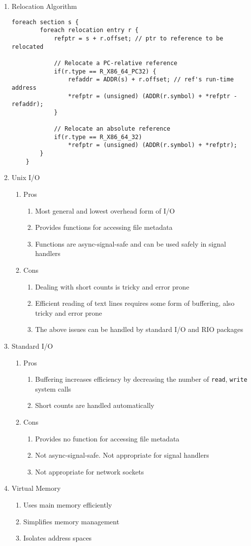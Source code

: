 \documentclass[12pt]{article}
\begin{document}
{\begin{enumerate}
\item Relocation Algorithm
\begin{lstlisting}[style=Cstyle]
	foreach section s {
		foreach relocation entry r {
			refptr = s + r.offset; // ptr to reference to be relocated
			
			// Relocate a PC-relative reference
			if(r.type == R_X86_64_PC32) {
				refaddr = ADDR(s) + r.offset; // ref's run-time address
				*refptr = (unsigned) (ADDR(r.symbol) + *refptr - refaddr);
			}
			
			// Relocate an absolute reference
			if(r.type == R_X86_64_32)
				*refptr = (unsigned) (ADDR(r.symbol) + *refptr);
		}
	}
\end{lstlisting}

\item Unix I/O
\begin{enumerate}
	\item Pros
	\begin{enumerate}
		\item Most general and lowest overhead form of I/O
		\item Provides functions for accessing file metadata
		\item Functions are async-signal-safe and can be used safely in signal handlers
	\end{enumerate}
	\item Cons
	\begin{enumerate}
		\item Dealing with short counts is tricky and error prone
		\item Efficient reading of text lines requires some form of buffering, also tricky and error prone
		\item The above issues can be handled by standard I/O and RIO packages
	\end{enumerate}
\end{enumerate}
\item Standard I/O
\begin{enumerate}
	\item Pros
	\begin{enumerate}
		\item Buffering increases efficiency by decreasing the number of \texttt{read}, \texttt{write} system calls
		\item Short counts are handled automatically
	\end{enumerate}
	\item Cons
	\begin{enumerate}
		\item Provides no function for accessing file metadata
		\item Not async-signal-safe. Not appropriate for signal handlers
		\item Not appropriate for network sockets
	\end{enumerate}
\end{enumerate}

\item Virtual Memory
\begin{enumerate}
	\item Uses main memory efficiently
	\item Simplifies memory management
	\item Isolates address spaces
\end{enumerate}
\end{enumerate}
}
\end{document}
